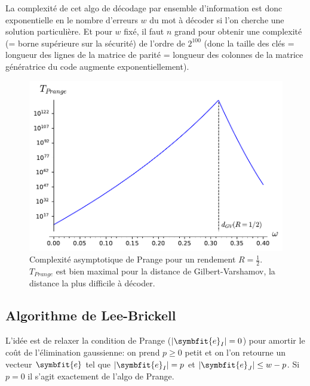 \documentclass[a4paper,11pt,headings=small,footinclude=false]{scrartcl}
\theoremstyle{definition}
\theoremstyle{remark}
\begin{document}
La complexité de cet algo de décodage par ensemble d'information est donc exponentielle en le nombre d'erreurs $w$ du mot à décoder si l'on cherche une solution particulière. Et pour $w$ fixé, il faut $n$ grand pour obtenir une complexité (= borne supérieure sur la sécurité) de l'ordre de $2^{100}$ (donc la taille des clés = longueur des lignes de la matrice de parité = longueur des colonnes de la matrice génératrice du code augmente exponentiellement).

\begin{figure}[h]
\centering
\includegraphics{decodage_syndrome/prange.pdf}
\caption{Complexité asymptotique de Prange pour un rendement $R=\frac{1}{2}$. $T_{Prange}$ est bien maximal pour la distance de Gilbert-Varshamov, la distance la plus difficile à décoder.}
\label{fig:prange}
\end{figure}


\subsection{Algorithme de Lee-Brickell}

L'idée est de relaxer la condition de Prange ($|\symbfit{e}_I|=0$) pour amortir le coût de l'élimination gaussienne: on prend $p\geq 0$ petit et on l'on retourne un vecteur $\symbfit{e}$ tel que $|\symbfit{e}_I|=p$ et $|\symbfit{e}_J|\leq w-p$. Si $p=0$ il s'agit exactement de l'algo de Prange.
\end{document}
